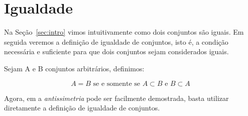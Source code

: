 \section{Igualdade}

Na Seção~\ref{sec:intro} vimos intuitivamente como dois conjuntos são iguais. Em seguida veremos a definição de igualdade de conjuntos, isto é, a condição necessária e suficiente para que dois conjuntos sejam considerados iguais.

\begin{definition}
\label{def:=}
Sejam A e B conjuntos arbitrários, definimos:

	$$ A = B \text{ se e somente se } A \subset B \text{ e } B \subset A $$

\end{definition}

\begin{remark}
	Agora, em  a \textit{antissimetria} pode ser facilmente demostrada, basta utilizar diretamente a definição de igualdade de conjuntos.
\end{remark}

